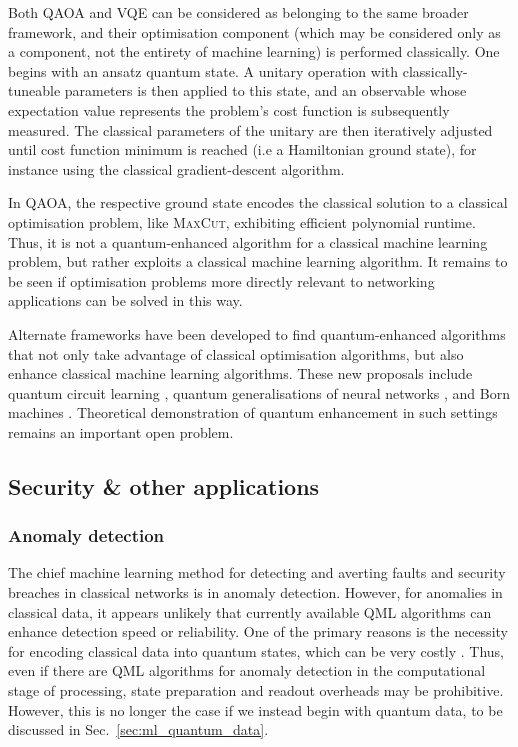 \documentclass[twocolumn, aps, rmp, amsmath, amssymb, nofootinbib, superscriptaddress, longbibliography, floatfix, table-of-contents, eqsecnum]{revtex4}
\begin{document}
Both QAOA and VQE can be considered as belonging to the same broader framework, and their optimisation component (which may be considered only as a component, not the entirety of machine learning) is performed classically. One begins with an ansatz quantum state. A unitary operation with classically-tuneable parameters is then applied to this state, and an observable whose expectation value represents the problem's cost function is subsequently measured. The classical parameters of the unitary are then iteratively adjusted until cost function minimum is reached (i.e a Hamiltonian ground state), for instance using the classical gradient-descent algorithm.

In QAOA, the respective ground state encodes the classical solution to a classical optimisation problem, like \textsc{MaxCut}, exhibiting efficient polynomial runtime. Thus, it is not a quantum-enhanced algorithm for a classical machine learning problem, but rather exploits a classical machine learning algorithm. It remains to be seen if optimisation problems more directly relevant to networking applications can be solved in this way.

Alternate frameworks have been developed to find quantum-enhanced algorithms that not only take advantage of classical optimisation algorithms, but also enhance classical machine learning algorithms. These new proposals include quantum circuit learning \cite{bib:mitarai2018quantum}, quantum generalisations of neural networks \cite{wan2017quantum}, and Born machines \cite{bib:cheng2018information, bib:benedetti2018generative}. Theoretical demonstration of quantum enhancement in such settings remains an important open problem.

\subsection{Security \& other applications}

\subsubsection{Anomaly detection}

The chief machine learning method for detecting and averting faults and security breaches in classical networks is in anomaly detection. However, for anomalies in classical data, it appears unlikely that currently available QML algorithms can enhance detection speed or reliability. One of the primary reasons is the necessity for encoding classical data into quantum states, which can be very costly \cite{bib:aaronson2015read}. Thus, even if there are QML algorithms for anomaly detection in the computational stage of processing, state preparation and readout overheads may be prohibitive. However, this is no longer the case if we instead begin with quantum data, to be discussed in Sec.~\ref{sec:ml_quantum_data}.
\end{document}
